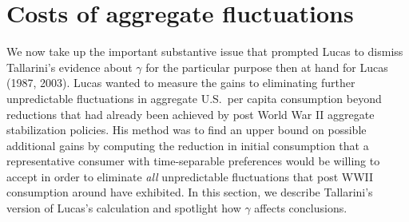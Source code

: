 \section{Costs of aggregate fluctuations}\label{sec:costsfluctuations}%
 We now take up the important substantive issue that prompted Lucas to dismiss Tallarini's evidence about $\gamma$ for the particular purpose then at hand for Lucas (1987, 2003).
 Lucas wanted to measure  the gains to eliminating further unpredictable fluctuations in aggregate U.S.\ per capita consumption beyond reductions  that had
 already been achieved by post World War II aggregate stabilization policies. His method was to find an upper bound on   possible additional  gains by computing the reduction in initial consumption that a representative consumer with time-separable
 preferences would be willing to accept in order to eliminate {\it all\/} unpredictable fluctuations that post WWII consumption around have exhibited.  In this section, we describe Tallarini's version
 of Lucas's calculation and spotlight how  $\gamma$ affects conclusions.  

